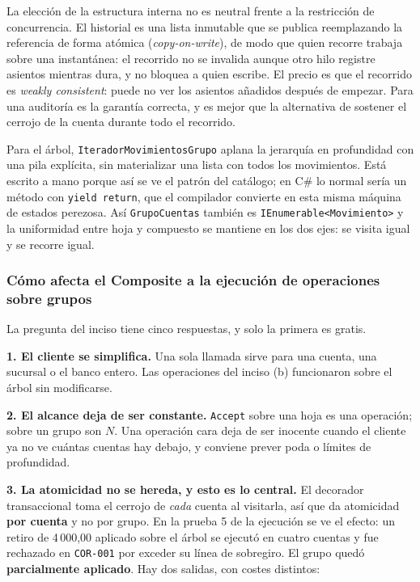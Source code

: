 La elección de la estructura interna no es neutral frente a la restricción de concurrencia. El
historial es una lista inmutable que se publica reemplazando la referencia de forma atómica
(\textit{copy-on-write}), de modo que quien recorre trabaja sobre una instantánea: el
recorrido no se invalida aunque otro hilo registre asientos mientras dura, y no bloquea a
quien escribe. El precio es que el recorrido es
\textit{weakly consistent}: puede no ver los asientos añadidos después de empezar. Para una
auditoría es la garantía correcta, y es mejor que la alternativa de sostener el cerrojo de la
cuenta durante todo el recorrido.

Para el árbol, \texttt{IteradorMovimientosGrupo} aplana la jerarquía en profundidad con una
pila explícita, sin materializar una lista con todos los movimientos. Está escrito a mano
porque así se ve el patrón del catálogo; en C\# lo normal sería un método con
\texttt{yield return}, que el compilador convierte en esta misma máquina de estados perezosa.
Así \texttt{GrupoCuentas} también es \texttt{IEnumerable<Movimiento>} y la uniformidad entre hoja y
compuesto se mantiene en los dos ejes: se visita igual y se recorre igual.

\subsubsection*{Cómo afecta el Composite a la ejecución de operaciones sobre grupos}

La pregunta del inciso tiene cinco respuestas, y solo la primera es gratis.

\textbf{1. El cliente se simplifica.} Una sola llamada sirve para una cuenta, una sucursal o el
banco entero. Las operaciones del inciso (b) funcionaron sobre el árbol sin modificarse.

\textbf{2. El alcance deja de ser constante.} \texttt{Accept} sobre una hoja es una operación;
sobre un grupo son $N$. Una operación cara deja de ser inocente cuando el cliente ya no ve
cuántas cuentas hay debajo, y conviene prever poda o límites de profundidad.

\textbf{3. La atomicidad no se hereda, y esto es lo central.} El decorador transaccional toma
el cerrojo de \emph{cada} cuenta al visitarla, así que da atomicidad \textbf{por cuenta} y no
por grupo. En la prueba 5 de la ejecución se ve el efecto: un retiro de 4\,000,00 aplicado
sobre el árbol se ejecutó en cuatro cuentas y fue rechazado en \texttt{COR-001} por exceder su
línea de sobregiro. El grupo quedó \textbf{parcialmente aplicado}. Hay dos salidas, con costes
distintos:

